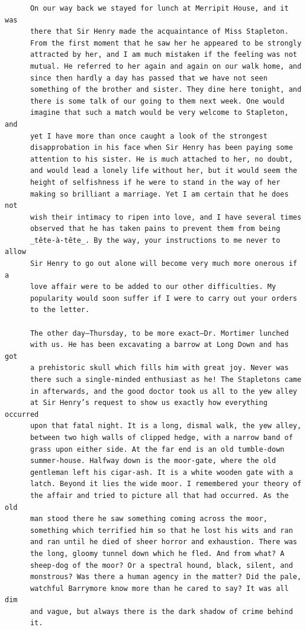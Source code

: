 \documentclass{article}
\begin{document}
\begin{verbatim}
      On our way back we stayed for lunch at Merripit House, and it was
      there that Sir Henry made the acquaintance of Miss Stapleton.
      From the first moment that he saw her he appeared to be strongly
      attracted by her, and I am much mistaken if the feeling was not
      mutual. He referred to her again and again on our walk home, and
      since then hardly a day has passed that we have not seen
      something of the brother and sister. They dine here tonight, and
      there is some talk of our going to them next week. One would
      imagine that such a match would be very welcome to Stapleton, and
      yet I have more than once caught a look of the strongest
      disapprobation in his face when Sir Henry has been paying some
      attention to his sister. He is much attached to her, no doubt,
      and would lead a lonely life without her, but it would seem the
      height of selfishness if he were to stand in the way of her
      making so brilliant a marriage. Yet I am certain that he does not
      wish their intimacy to ripen into love, and I have several times
      observed that he has taken pains to prevent them from being
      _tête-à-tête_. By the way, your instructions to me never to allow
      Sir Henry to go out alone will become very much more onerous if a
      love affair were to be added to our other difficulties. My
      popularity would soon suffer if I were to carry out your orders
      to the letter.

      The other day—Thursday, to be more exact—Dr. Mortimer lunched
      with us. He has been excavating a barrow at Long Down and has got
      a prehistoric skull which fills him with great joy. Never was
      there such a single-minded enthusiast as he! The Stapletons came
      in afterwards, and the good doctor took us all to the yew alley
      at Sir Henry’s request to show us exactly how everything occurred
      upon that fatal night. It is a long, dismal walk, the yew alley,
      between two high walls of clipped hedge, with a narrow band of
      grass upon either side. At the far end is an old tumble-down
      summer-house. Halfway down is the moor-gate, where the old
      gentleman left his cigar-ash. It is a white wooden gate with a
      latch. Beyond it lies the wide moor. I remembered your theory of
      the affair and tried to picture all that had occurred. As the old
      man stood there he saw something coming across the moor,
      something which terrified him so that he lost his wits and ran
      and ran until he died of sheer horror and exhaustion. There was
      the long, gloomy tunnel down which he fled. And from what? A
      sheep-dog of the moor? Or a spectral hound, black, silent, and
      monstrous? Was there a human agency in the matter? Did the pale,
      watchful Barrymore know more than he cared to say? It was all dim
      and vague, but always there is the dark shadow of crime behind
      it.


\end{verbatim}
\end{document}
